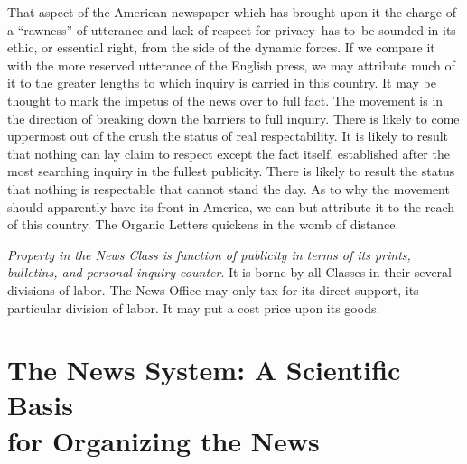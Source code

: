 \documentclass[openany,nobib]{tufte-book}
\let\oldchapter\chapter
\def\chapter{%
  \setcounter{footnote}{0}%
  \oldchapter
}
\begin{document}
That aspect of the American newspaper which has brought upon it the
charge of a ``rawness'' of utterance and lack of respect for privacy~has
to~be sounded in its ethic, or essential right, from the side of the
dynamic forces. If we compare it with the more reserved utterance of the
English press, we may attribute much of it to the greater lengths to
which inquiry is carried in this country. It may be thought to mark the
impetus of the news over to full fact. The movement is in the direction
of breaking down the barriers to full inquiry. There is likely to come
uppermost out of the crush the status of real respectability. It is
likely to result that nothing can lay claim to respect except the fact
itself, established after the most searching inquiry in the fullest
publicity. There is likely to result the status that nothing is
respectable that cannot stand the day. As to why the movement should
apparently have its front in America, we can but attribute it to the
reach of this country. The Organic Letters quickens in the womb of
distance.~

\vspace{0.05in}

\emph{Property in the News Class is function of publicity in terms of
its prints, bulletins, and personal inquiry counter}. It is borne by all
Classes in their several divisions of labor. The News-Office may only
tax for its direct support, its particular division of labor. It may put
a cost price upon its goods.~~


\chapter[The News System: A Scientific Basis for Organizing the News]{The News System: A Scientific Basis\\\noindent for Organizing the News}
\label{ch:The News System: A Scientific Basis for Organizing the News}

\vspace{.2in}

\begin{LARGE}


\end{LARGE}
\end{document}
